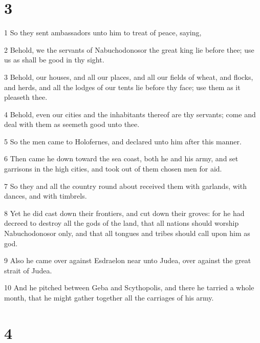 \chapter{3}

\par 1 So they sent ambassadors unto him to treat of peace, saying,
\par 2 Behold, we the servants of Nabuchodonosor the great king lie before thee; use us as shall be good in thy sight.
\par 3 Behold, our houses, and all our places, and all our fields of wheat, and flocks, and herds, and all the lodges of our tents lie before thy face; use them as it pleaseth thee.
\par 4 Behold, even our cities and the inhabitants thereof are thy servants; come and deal with them as seemeth good unto thee.
\par 5 So the men came to Holofernes, and declared unto him after this manner.
\par 6 Then came he down toward the sea coast, both he and his army, and set garrisons in the high cities, and took out of them chosen men for aid.
\par 7 So they and all the country round about received them with garlands, with dances, and with timbrels.
\par 8 Yet he did cast down their frontiers, and cut down their groves: for he had decreed to destroy all the gods of the land, that all nations should worship Nabuchodonosor only, and that all tongues and tribes should call upon him as god.
\par 9 Also he came over against Esdraelon near unto Judea, over against the great strait of Judea.
\par 10 And he pitched between Geba and Scythopolis, and there he tarried a whole month, that he might gather together all the carriages of his army.

\chapter{4}

